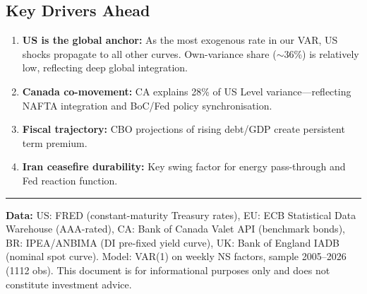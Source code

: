 \documentclass[11pt,a4paper]{article}
\begin{document}
\subsection*{Key Drivers Ahead}
\begin{enumerate}[nosep, leftmargin=1.4em]
    \item \textbf{US is the global anchor:} As the most exogenous rate in our VAR, US shocks propagate to all other curves. Own-variance share ($\sim$36\%) is relatively low, reflecting deep global integration.
    \item \textbf{Canada co-movement:} CA explains 28\% of US Level variance---reflecting NAFTA integration and BoC/Fed policy synchronisation.
    \item \textbf{Fiscal trajectory:} CBO projections of rising debt/GDP create persistent term premium.
    \item \textbf{Iran ceasefire durability:} Key swing factor for energy pass-through and Fed reaction function.
\end{enumerate}


\vspace{0.3cm}
\noindent\rule{\textwidth}{0.4pt}
{\footnotesize\color{biggrey} \textbf{Data:} US: FRED (constant-maturity Treasury rates), EU: ECB Statistical Data Warehouse (AAA-rated), CA: Bank of Canada Valet API (benchmark bonds), BR: IPEA/ANBIMA (DI pre-fixed yield curve), UK: Bank of England IADB (nominal spot curve). Model: VAR(1) on weekly NS factors, sample 2005--2026 (1112 obs). This document is for informational purposes only and does not constitute investment advice.}
\end{document}
